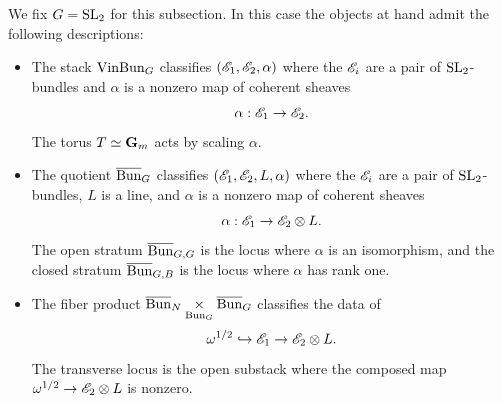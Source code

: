 \subsubsection{} We fix $G = \mathrm{SL}_2$ for this subsection. In this case the objects at hand admit the following descriptions:
\begin{itemize}
    \item The stack $\mathrm{Vin}\mathrm{Bun}_G$ classifies $(\mathscr{E}_1, \mathscr{E}_2, \alpha)$ where the $\mathscr{E}_i$ are a pair of $\mathrm{SL}_2$-bundles and $\alpha$ is a nonzero map of coherent sheaves
        \[\alpha : \mathscr{E}_1 \to \mathscr{E}_2.\]
    The torus $T \simeq \mathbf{G}_m$ acts by scaling $\alpha$.
    \item The quotient $\overline{\mathrm{Bun}}_G$ classifies $(\mathscr{E}_1, \mathscr{E}_2, L, \alpha)$ where the $\mathscr{E}_i$ are a pair of $\mathrm{SL}_2$-bundles, $L$ is a line, and $\alpha$ is a nonzero map of coherent sheaves
        \[\alpha : \mathscr{E}_1 \to \mathscr{E}_2 \otimes L.\]
    The open stratum $\overline{\mathrm{Bun}}_{G,G}$ is the locus where $\alpha$ is an isomorphism, and the closed stratum $\overline{\mathrm{Bun}}_{G,B}$ is the locus where $\alpha$ has rank one.
    \item The fiber product $\overline{\mathrm{Bun}}_N \underset{\mathrm{Bun}_G}{\times} \overline{\mathrm{Bun}}_G$ classifies the data of
        \[\omega^{1/2} \hookrightarrow \mathscr{E}_1 \to \mathscr{E}_2 \otimes L.\]
    The transverse locus is the open substack where the composed map $\omega^{1/2} \to \mathscr{E}_2 \otimes L$ is nonzero.
\end{itemize}

